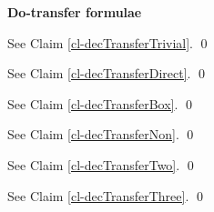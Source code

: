 {\bf Do-transfer formulae}

\begin{claim}
\decTransferTrivial
\end{claim}
\proof
See Claim \ref{cl-decTransferTrivial}.
\qed


\begin{claim}
\decTransferDirect
\end{claim}
\proof
See Claim \ref{cl-decTransferDirect}.
\qed


\begin{claim}
\decTransferBox
\end{claim}
\proof
See Claim 
\ref{cl-decTransferBox}.
\qed



\begin{claim}
\decTransferNon
\end{claim}
\proof
See Claim 
\ref{cl-decTransferNon}.
\qed

\begin{claim}
\decTransferTwo
\end{claim}
\proof
See Claim \ref{cl-decTransferTwo}.
\qed

\begin{claim}
\decTransferThree
\end{claim}
\proof
See Claim \ref{cl-decTransferThree}.
\qed